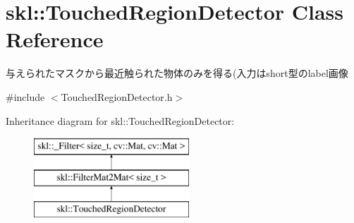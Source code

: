 \hypertarget{classskl_1_1_touched_region_detector}{}\section{skl\+:\+:Touched\+Region\+Detector Class Reference}
\label{classskl_1_1_touched_region_detector}


与えられたマスクから最近触られた物体のみを得る(入力はshort型のlabel画像  




{\ttfamily \#include $<$Touched\+Region\+Detector.\+h$>$}

Inheritance diagram for skl\+:\+:Touched\+Region\+Detector\+:\begin{figure}[H]
\begin{center}
\leavevmode
\includegraphics[height=3.000000cm]{classskl_1_1_touched_region_detector}
\end{center}
\end{figure}
